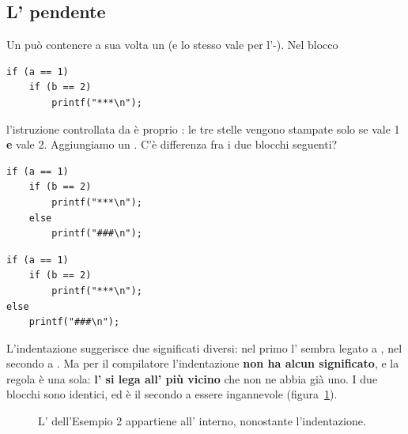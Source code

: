 \subsection{L' pendente}

Un  può contenere a sua volta un  (e lo stesso vale per
l'-). Nel blocco

\begin{lstlisting}[style=c]
if (a == 1)
    if (b == 2)
        printf("***\n");
\end{lstlisting}

l'istruzione controllata da  è proprio
: le tre stelle vengono
stampate solo se  vale 1 \textbf{e}  vale 2. Aggiungiamo un
. C'è differenza fra i due blocchi seguenti?

\begin{affianco}[0.5][c]
\begin{lstlisting}[style=c, name=Esempio 1]
if (a == 1)
    if (b == 2)
        printf("***\n");
    else
        printf("###\n");
\end{lstlisting}
\risultato
\begin{lstlisting}[style=c, name=Esempio 2]
if (a == 1)
    if (b == 2)
        printf("***\n");
else
    printf("###\n");
\end{lstlisting}
\end{affianco}

L'indentazione suggerisce due significati diversi: nel primo l'
sembra legato a , nel secondo a . Ma per
il compilatore l'indentazione \textbf{non ha alcun significato}, e la regola
è una sola: \textbf{l' si lega all' più vicino} che non
ne abbia già uno. I due blocchi sono identici, ed è il secondo a essere
ingannevole (figura~\ref{fig:else-pendente}).

\begin{figure}[H]
  \centering
  \caption{L' dell'Esempio 2 appartiene all' interno,
           nonostante l'indentazione.}
  \label{fig:else-pendente}
\end{figure}

